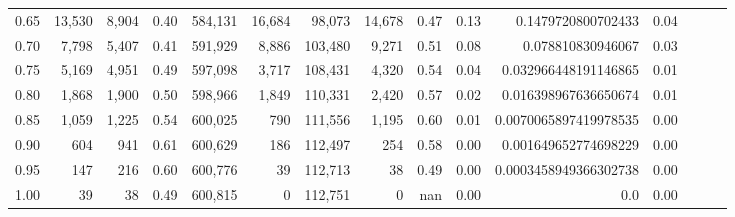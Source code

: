 \begin{tabular}{rrrrrrrrrrrrrrr}
0.65 &  13,530 &   8,904 &  0.40 &  584,131 &   16,684 &   98,073 &   14,678 &  0.47 &  0.13 &     0.1479720800702433 &      0.04 \\
0.70 &   7,798 &   5,407 &  0.41 &  591,929 &    8,886 &  103,480 &    9,271 &  0.51 &  0.08 &      0.078810830946067 &      0.03 \\
0.75 &   5,169 &   4,951 &  0.49 &  597,098 &    3,717 &  108,431 &    4,320 &  0.54 &  0.04 &   0.032966448191146865 &      0.01 \\
0.80 &   1,868 &   1,900 &  0.50 &  598,966 &    1,849 &  110,331 &    2,420 &  0.57 &  0.02 &   0.016398967636650674 &      0.01 \\
0.85 &   1,059 &   1,225 &  0.54 &  600,025 &      790 &  111,556 &    1,195 &  0.60 &  0.01 &  0.0070065897419978535 &      0.00 \\
0.90 &     604 &     941 &  0.61 &  600,629 &      186 &  112,497 &      254 &  0.58 &  0.00 &   0.001649652774698229 &      0.00 \\
0.95 &     147 &     216 &  0.60 &  600,776 &       39 &  112,713 &       38 &  0.49 &  0.00 &  0.0003458949366302738 &      0.00 \\
1.00 &      39 &      38 &  0.49 &  600,815 &        0 &  112,751 &        0 &   nan &  0.00 &                    0.0 &      0.00 \\
\bottomrule
\end{tabular}
